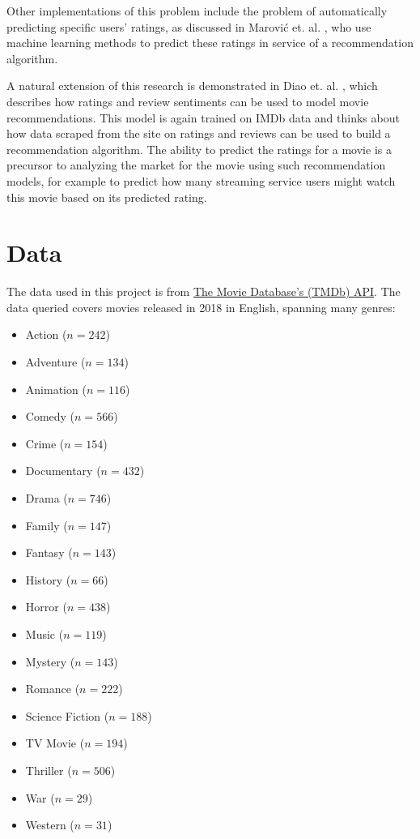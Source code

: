 \documentclass[12pt, oneside]{article}   	%
\begin{document}
Other implementations of this problem include the problem of automatically predicting specific users' ratings, as discussed in Marović et. al. \cite{marovic_automatic_2011}, who use machine learning methods to predict these ratings in service of a recommendation algorithm.

A natural extension of this research is demonstrated in Diao et. al. \cite{diao_jointly_2014}, which describes how ratings and review sentiments can be used to model movie recommendations. This model is again trained on IMDb data and thinks about how data scraped from the site on ratings and reviews can be used to build a recommendation algorithm. The ability to predict the ratings for a movie is a precursor to analyzing the market for the movie using such recommendation models, for example to predict how many streaming service users might watch this movie based on its predicted rating. 

\newpage

\section{Data}

The data used in this project is from \href{https://api.tmdb.org}{The Movie Database's (TMDb) API}. The data queried covers movies released in 2018 in English, spanning many genres: 

\begin{itemize}
\item Action ($n=242$)
\item Adventure ($n=134$)
\item Animation ($n=116$)
\item Comedy ($n=566$)
\item Crime ($n=154$)
\item Documentary ($n=432$)
\item Drama ($n=746$)
\item Family ($n=147$)
\item Fantasy ($n=143$)
\item History ($n=66$)
\item Horror ($n=438$)
\item Music ($n=119$)
\item Mystery ($n=143$)
\item Romance ($n=222$)
\item Science Fiction ($n=188$)
\item TV Movie ($n=194$)
\item Thriller ($n=506$)
\item War ($n=29$)
\item Western ($n=31$)
\end{itemize}
\end{document}
